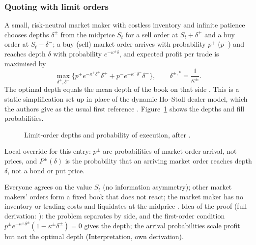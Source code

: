 \subsubsection{Quoting with limit orders}

\begin{qfmodel}\label{mod:static-limit-order-depth}
 A small, risk-neutral market maker with costless inventory and infinite patience chooses depths $\delta^\pm$ from the midprice $S_t$ for a sell order at $S_t+\delta^+$ and a buy order at $S_t-\delta^-$; a buy (sell) market order arrives with probability $p^+$ ($p^-$) and reaches depth $\delta$ with probability $e^{-\kappa^\pm\delta}$, and expected profit per trade is maximised by \citep[chap.~``A Primer on the Microstructure of Financial Markets'', p.~29, eq.~(2.3)]{crypto-cartea}
\[ \max_{\delta^+,\delta^-}\Big\{p^+e^{-\kappa^+\delta^+}\delta^+ + p^-e^{-\kappa^-\delta^-}\delta^-\Big\}, \qquad \delta^{\pm,\ast}=\frac{1}{\kappa^\pm}. \]
The optimal depth equals the mean depth of the book on that side \citep[same chap., p.~30]{crypto-cartea}. This is a static simplification set up in place of the dynamic Ho--Stoll dealer model, which the authors give as the usual first reference \citep[same chap., p.~28]{crypto-cartea}. Figure~\ref{fig:limit_order_market_making} shows the depths and fill probabilities.
\begin{figure}[H]
\centering
\scalebox{0.86}{}
\caption{Limit-order depths and probability of execution, after \citep[Figure~2.2, p.~30]{crypto-cartea}.}\label{fig:limit_order_market_making}
\end{figure}

 Local override for this entry: $p^\pm$ are probabilities of market-order arrival, not prices, and $P^\pm(\delta)$ is the probability that an arriving market order reaches depth $\delta$, not a bond or put price.

 Everyone agrees on the value $S_t$ (no information asymmetry); other market makers' orders form a fixed book that does not react; the market maker has no inventory or trading costs and liquidates at the midprice \citep[same chap., pp.~28--29]{crypto-cartea}. Idea of the proof (full derivation: ): the problem separates by side, and the first-order condition $p^\pm e^{-\kappa^\pm\delta^\pm}(1-\kappa^\pm\delta^\pm)=0$ gives the depth; the arrival probabilities scale profit but not the optimal depth (Interpretation, own derivation).


\end{qfmodel}
